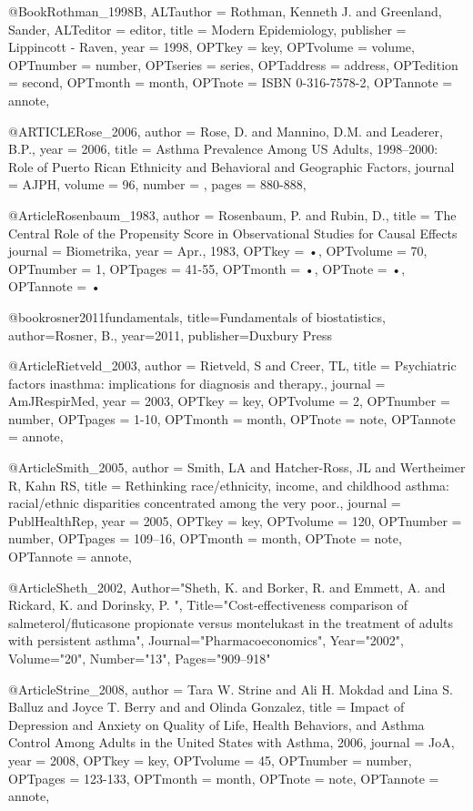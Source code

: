 {{{@Book{Rothman_1998B,
ALTauthor = {Rothman, Kenneth J. and Greenland, Sander},
ALTeditor = {editor},
title = {Modern Epidemiology},
publisher = {Lippincott - Raven},
year = {1998},
OPTkey = {key},
OPTvolume = {volume},
OPTnumber = {number},
OPTseries = {series},
OPTaddress = {address},
OPTedition = {second},
OPTmonth = {month},
OPTnote = {{ISBN} 0-316-7578-2},
OPTannote = {annote},
}


@ARTICLE{Rose_2006,
  author = {Rose, D. and Mannino, D.M. and Leaderer, B.P.},
  year = {2006},
  title = {Asthma Prevalence Among US Adults, 1998–2000: Role of Puerto Rican Ethnicity and Behavioral and Geographic Factors},
  journal = AJPH,
  volume =  {96},
  number = {},
  pages = {880-888},
}

@Article{Rosenbaum_1983,
author = {Rosenbaum, P. and Rubin, D.},
title = {The Central Role of the Propensity Score in Observational Studies for Causal Effects}
journal = {Biometrika},
year = {Apr., 1983},
OPTkey = {•},
OPTvolume = {70},
OPTnumber = {1},
OPTpages = {41-55},
OPTmonth = {•},
OPTnote = {•},
OPTannote = {•}
}

@book{rosner2011fundamentals,
  title={Fundamentals of biostatistics},
  author={Rosner, B.},
  year={2011},
  publisher={Duxbury Press}
}

@Article{Rietveld_2003,
author = {Rietveld, S and Creer, TL},
title = {Psychiatric factors inasthma: implications for diagnosis and therapy.},
journal = {AmJRespirMed},
year = {2003},
OPTkey = {key},
OPTvolume = {2},
OPTnumber = {number},
OPTpages = {1-10},
OPTmonth = {month},
OPTnote = {note},
OPTannote = {annote},
}



@Article{Smith_2005,
author = {Smith, LA and Hatcher-Ross, JL and Wertheimer R, Kahn RS},
title = {Rethinking race/ethnicity, income, and childhood asthma: racial/ethnic disparities concentrated
among the very poor.},
journal = {PublHealthRep},
year = {2005},
OPTkey = {key},
OPTvolume = {120},
OPTnumber = {number},
OPTpages = {109–16},
OPTmonth = {month},
OPTnote = {note},
OPTannote = {annote},
}

@Article{Sheth_2002,
   Author="Sheth, K.  and Borker, R.  and Emmett, A.  and Rickard, K.  and Dorinsky, P. ",
   Title="{{C}ost-effectiveness comparison of salmeterol/fluticasone propionate versus montelukast in the treatment of adults with persistent asthma}",
   Journal="Pharmacoeconomics",
   Year="2002",
   Volume="20",
   Number="13",
   Pages="909--918"
}


@Article{Strine_2008,
author = {Tara W. Strine and Ali H. Mokdad and Lina S. Balluz and Joyce T. Berry and and Olinda Gonzalez},
title = {Impact of Depression and Anxiety on Quality of Life, Health Behaviors, and Asthma Control Among Adults in the United States with Asthma, 2006},
journal = {JoA},
year = {2008},
OPTkey = {key},
OPTvolume = {45},
OPTnumber = {number},
OPTpages = {123-133},
OPTmonth = {month},
OPTnote = {note},
OPTannote = {annote},
}

}}}
